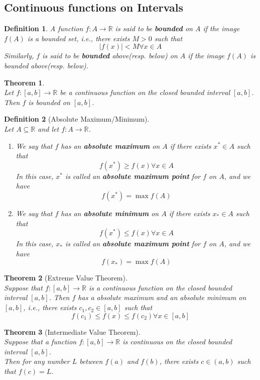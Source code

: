 \documentclass[12pt]{article}
\newtheorem{definition}{Definition}[section]
\newtheorem{theorem}{Theorem}[section]
\theoremstyle{definition}
\begin{document}
\subsection{Continuous functions on Intervals}
\begin{definition}\normalfont A function $f:A\to\mathbb{R}$ is said to be \textbf{bounded} on $A$ if the image $f(A)$ is a bounded set, i.e., there exists $M>0$ such that 
\[
|f(x)|<M\forall x\in A
\]
Similarly, $f$ is said to be \textbf{bounded} above(resp. below) on $A$ if the image $f(A)$ is bounded above(resp. below).
\end{definition}
\begin{theorem}\hfill\\\normalfont
Let $f:[a,b]\to\mathbb{R}$ be a continuous function on the closed bounded interval $[a,b]$. Then $f$ is bounded on $[a,b]$.
\end{theorem}
\begin{definition}[Absolute Maximum/Minimum]
\hfill\\\normalfont Let $A\subseteq\mathbb{R}$ and let $f:A\to\mathbb{R}$.
\begin{enumerate}
\item We say that $f$ has an \textbf{absolute maximum} on $A$ if there exists $x^\ast\in A$ such that
\[
f(x^\ast)\geq f(x) \forall x\in A
\]
In this case, $x^\ast$ is called an \textbf{absolute maximum point} for $f$ on $A$, and we have
\[
f(x^\ast)=\max f(A)
\]
\item We say that $f$ has an \textbf{absolute minimum} on $A$ if there exists $x_\ast\in A$ such that
\[
f(x^\ast)\leq f(x) \forall x\in A
\]
In this case, $x_\ast$ is called an \textbf{absolute maximum point} for $f$ on $A$, and we have
\[
f(x_\ast)=\max f(A)
\]
\end{enumerate}
\end{definition}
\begin{theorem}[Extreme Value Theorem]
\hfill\\\normalfont
Suppose that $f:[a,b]\to\mathbb{R}$ is a continuous function on the closed bounded interval $[a,b]$. Then $f$ has a absolute maximum and an absolute minimum on $[a,b]$, i.e., there exists $c_1, c_2\in[a,b]$ such that
\[
f(c_1)\leq f(x)\leq f(c_2)\forall x\in [a,b]
\]
\end{theorem}
\begin{theorem}[Intermediate Value Theorem]
\hfill\\\normalfont Suppose that a function $f:[a,b]\to\mathbb{R}$ is continuous on the closed bounded interval $[a,b]$.\\
Then for any number $L$ between $f(a)$ and $f(b)$, there exists $c\in(a,b)$ such that $f(c)=L$.
\end{theorem}
\end{document}
